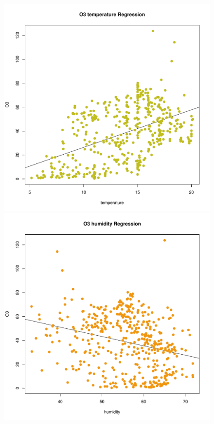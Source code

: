 \documentclass[a4paper,12pt,reqno]{report}
\begin{document}
\begin{figure}[H]
    \includegraphics[width=0.4\linewidth]{figures/O3_temperature_Regression.pdf}
    \includegraphics[width=0.4\linewidth]{figures/O3_humidity_Regression.pdf}
\end{figure}
\end{document}
